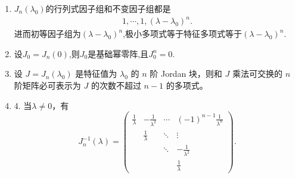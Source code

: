 \documentclass[../../main.tex]{subfiles}
\begin{document}
\begin{proposition}[Jordan块的性质]\label{proposition:Jordan块的性质}
\begin{enumerate}[(1)]
\item $J_n(\lambda_0)$的行列式因子组和不变因子组都是
\begin{align*}
1,\cdots,1,(\lambda-\lambda_0)^n.
\end{align*}
进而初等因子组为$(\lambda-\lambda_0)^n$,极小多项式等于特征多项式等于$(\lambda-\lambda_0)^n$.

\item 设$J_0=J_n(0)$,则$J_0$是基础幂零阵,且$J_0^n=0.$

\item 设 $J = J_n(\lambda_0)$ 是特征值为 $\lambda_0$ 的 $n$ 阶 Jordan 块，则和 $J$ 乘法可交换的 $n$ 阶矩阵必可表示为 $J$ 的次数不超过 $n - 1$ 的多项式。

\item 4. 当$\lambda\neq 0$，有
\[
J_n^{-1}(\lambda)=
\begin{pmatrix}
\frac{1}{\lambda} & -\frac{1}{\lambda^2} & \cdots & (-1)^{n - 1}\frac{1}{\lambda^n} \\
 & \frac{1}{\lambda} & \ddots & \vdots \\
 &  & \ddots & -\frac{1}{\lambda^2} \\
 &  &  & \frac{1}{\lambda}
\end{pmatrix}.
\]
\end{enumerate}
\end{proposition}
\end{document}
